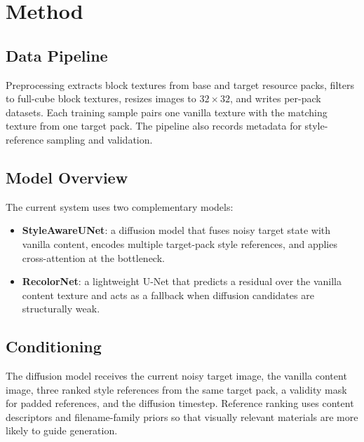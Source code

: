 \chapter{Method}
\label{chap:method}

\section{Data Pipeline}

Preprocessing extracts block textures from base and target resource packs, filters to full-cube block textures, resizes images to \(32 \times 32\), and writes per-pack datasets.
Each training sample pairs one vanilla texture with the matching texture from one target pack.
The pipeline also records metadata for style-reference sampling and validation.

\section{Model Overview}

The current system uses two complementary models:

\begin{itemize}
  \item \textbf{StyleAwareUNet}: a diffusion model that fuses noisy target state with vanilla content, encodes multiple target-pack style references, and applies cross-attention at the bottleneck.
  \item \textbf{RecolorNet}: a lightweight U-Net that predicts a residual over the vanilla content texture and acts as a fallback when diffusion candidates are structurally weak.
\end{itemize}


\section{Conditioning}

The diffusion model receives the current noisy target image, the vanilla content image, three ranked style references from the same target pack, a validity mask for padded references, and the diffusion timestep.
Reference ranking uses content descriptors and filename-family priors so that visually relevant materials are more likely to guide generation.

